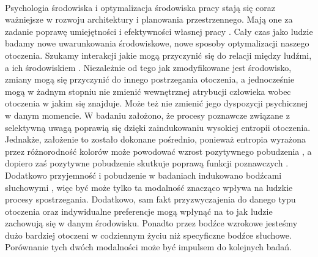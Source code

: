 \documentclass[12pt,a4paper,final,oneside,onecolumn,titlepage]{article}
\begin{document}
\paragraph{}
Psychologia środowiska i optymalizacja środowiska pracy stają się coraz ważniejsze w rozwoju architektury i planowania przestrzennego. Mają one za zadanie poprawę umiejętności i efektywności własnej pracy \citep{banka_psychologia_2018}. Cały czas jako ludzie badamy nowe uwarunkowania środowiskowe, nowe sposoby optymalizacji naszego otoczenia. Szukamy interakcji jakie mogą przyczynić się do relacji między ludźmi, a ich środowiskiem \citep{spano_human_2020}. Niezależnie od tego jak zmodyfikowane jest środowisko, zmiany mogą się przyczynić do innego postrzegania otoczenia, a jednocześnie mogą w żadnym stopniu nie zmienić wewnętrznej atrybucji człowieka wobec otoczenia w jakim się znajduje. Może też nie zmienić jego dyspozycji psychicznej w danym momencie. W badaniu założono, że procesy poznawcze związane z selektywną uwagą poprawią się dzięki zaindukowaniu wysokiej entropii otoczenia. Jednakże, założenie to zostało dokonane pośrednio, ponieważ entropia wyrażona przez różnorodność kolorów może powodować wzrost pozytywnego pobudzenia \citep{stamps_entropy_2004, stamps_entropy_2002}, a dopiero zaś pozytywne pobudzenie skutkuje poprawą funkcji poznawczych \citep{gavazzi_pleasure_2021}. Dodatkowo przyjemność i pobudzenie w badaniach indukowano bodźcami słuchowymi \citep{mcconnell_upbeat_2011}, więc być może tylko ta modalność znacząco wpływa na ludzkie procesy spostrzegania. Dodatkowo, sam fakt przyzwyczajenia do danego typu otoczenia oraz indywidualne preferencje mogą wpłynąć na to jak ludzie zachowują się w danym środowisku. Ponadto przez bodźce wzrokowe jesteśmy dużo bardziej otoczeni w codziennym życiu niż specyficzne bodźce słuchowe. Porównanie tych dwóch modalności może być impulsem do kolejnych badań.
\end{document}
